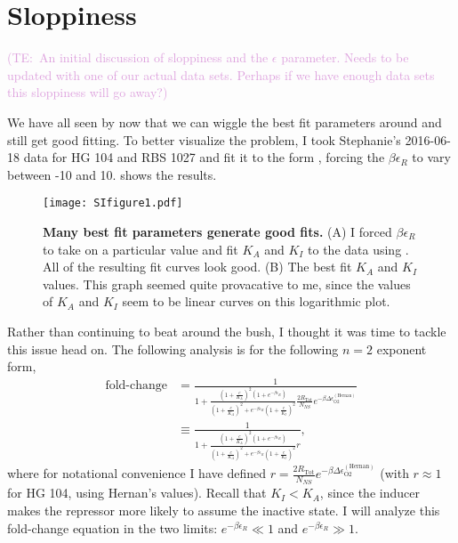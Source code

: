 \documentclass[10pt,letterpaper]{article}
\newcommand{\talComment}[1]{\textcolor{Plum}{(TE:~#1)}}
\newcommand{\letterParen}[1]{(#1)} %
\newcommand \foldchange{\operatorname{fold-change}}
\newcommand{\Rtot}{R_{\text{Tot}}}
\begin{document}
\appendix

\section{Sloppiness} \label{AppendixSloppiness}

\talComment{An initial discussion of sloppiness and the $\epsilon$ parameter. Needs to be updated with one of our actual data sets. Perhaps if we have enough data sets this sloppiness will go away?}

We have all seen by now that we can wiggle the best fit parameters around and still get good fitting. To better visualize the problem, I took Stephanie's 2016-06-18 data for HG 104 and RBS 1027 and fit it to the form \eref[AppendixSloppinessEq1], forcing the $\beta \epsilon_R$ to vary between -10 and 10. \fref[SIfig1] shows the results.
\begin{figure}[h]
	\centering \texttt{[image: SIfigure1.pdf]}
	\caption{{\bf Many best fit parameters generate good fits.} \letterParen{A} I forced $\beta \epsilon_R$ to take on a particular value and fit $K_A$ and $K_I$ to the data using \eref[AppendixSloppinessEq1]. All of the resulting fit curves look good. \letterParen{B} The best fit $K_A$ and $K_I$ values. This graph seemed quite provacative to me, since the values of $K_A$ and $K_I$ seem to be linear curves on this logarithmic plot.}
	\label{SIfig1}
\end{figure}

Rather than continuing to beat around the bush, I thought it was time to tackle this issue head on. The following analysis is for the following $n=2$
exponent form,
\begin{align} \label{AppendixSloppinessEq1}
\foldchange &= \frac{1}{1+\frac{\left( 1 + \frac{c}{K_A} \right)^2 \left(1 + e^{-\beta \epsilon_R} \right)}{\left( 1 + \frac{c}{K_A} \right)^2 + e^{-\beta \epsilon_R} \left( 1 + \frac{c}{K_I} \right)^2} \frac{2 \Rtot}{N_{NS}} e^{-\beta \Delta\epsilon_{\text{O2}}^{(\text{Hernan})}}}\nonumber\\
&\equiv \frac{1}{1+\frac{\left( 1 + \frac{c}{K_A} \right)^2 \left(1 + e^{-\beta \epsilon_R} \right)}{\left( 1 + \frac{c}{K_A} \right)^2 + e^{-\beta \epsilon_R} \left( 1 + \frac{c}{K_I} \right)^2} r},
\end{align}
where for notational convenience I have defined $r = \frac{2 \Rtot}{N_{NS}}
e^{-\beta \Delta\epsilon_{\text{O2}}^{(\text{Hernan})}}$ (with $r \approx 1$ for
HG 104, using Hernan's values). Recall that $K_I < K_A$, since the inducer makes
the repressor more likely to assume the inactive state. I will analyze this
fold-change equation in the two limits: $e^{-\beta \epsilon_R} \ll 1$ and
$e^{-\beta \epsilon_R} \gg 1$.
\end{document}
